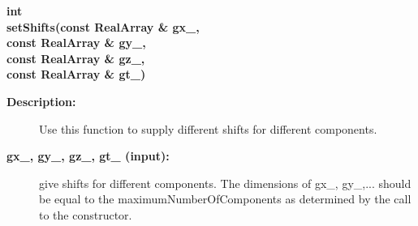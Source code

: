 \begin{flushleft} \textbf{%
int  \\ 
\settowidth{\OGTrigFunctionIncludeArgIndent}{setShifts(}%
setShifts(const RealArray \& gx\_, \\ 
\hspace{\OGTrigFunctionIncludeArgIndent}const RealArray \& gy\_, \\ 
\hspace{\OGTrigFunctionIncludeArgIndent}const RealArray \& gz\_, \\ 
\hspace{\OGTrigFunctionIncludeArgIndent}const RealArray \& gt\_)
}\end{flushleft}
\begin{description}
\item[{\bf Description:}]  
 
 Use this function to supply different shifts for different components.

\item[{\bf gx\_, gy\_, gz\_, gt\_ (input):}]  give shifts for different components. The dimensions of gx\_, gy\_,...
   should be equal to the maximumNumberOfComponents as determined by the call to the constructor.

\end{description}
